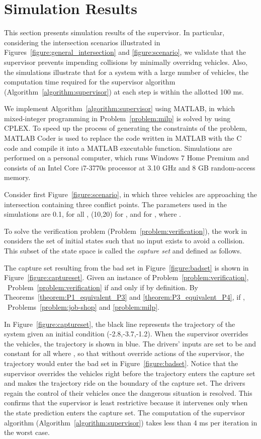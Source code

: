 \documentclass{sig-alternate}
\begin{document}
\section{Simulation Results}\label{section:simulation_results}
This section presents simulation results of the supervisor. In particular, considering the intersection scenarios illustrated in Figures~\ref{figure:general_intersection} and \ref{figure:scenario}, we validate that the supervisor prevents impending collisions by minimally overridng vehicles. Also, the simulations illustrate that for a system with a large number of vehicles, the computation time required for the supervisor algorithm (Algorithm~\ref{algorithm:supervisor}) at each step is within the allotted 100 ms.

 We implement Algorithm~\ref{algorithm:supervisor} using MATLAB, in which mixed-integer programming in Problem~\ref{problem:milp} is solved by using CPLEX. To speed up the process of generating the constraints of the problem, MATLAB Coder\texttrademark \cite{Matlab_coder_2015} is used to replace the code written in MATLAB with the C code and compile it into a MATLAB executable function. Simulations are performed on a personal computer, which runs Windows 7 Home Premium and consists of an Intel Core i7-3770s processor at 3.10 GHz and 8 GB random-access memory.

Consider first Figure~\ref{figure:scenario}, in which three vehicles are approaching the intersection containing three conflict points. The parameters used in the simulations are 0.1,  for all , (10,20) for , and  for , where . 

To solve the verification problem (Problem~\ref{problem:verification}), the work in \cite{hafner_cooperative_2013} considers the set of initial states such that no input exists to avoid a collision. This subset of the state space is called the \textit{capture set} and defined as follows.
	
	The capture set resulting from the bad set in Figure~\ref{figure:badset} is shown in Figure~\ref{figure:captureset}.
Given an instance  of Problem~\ref{problem:verification}, ~Problem~\ref{problem:verification} if and only if  by definition. By Theorems~\ref{theorem:P1_equivalent_P3} and \ref{theorem:P3_equivalent_P4}, if , ~Problems~\ref{problem:job-shop} and \ref{problem:milp}.

In Figure~\ref{figure:captureset}, the black line represents the trajectory of the system given an initial condition (-2.8,-3.7,-1.2). When the supervisor overrides the vehicles, the trajectory is shown in blue. The drivers' inputs are set to be  and constant for all  where , so that without override actions of the supervisor, the trajectory would enter the bad set in Figure~\ref{figure:badset}. Notice that the supervisor overrides the vehicles right before the trajectory enters the capture set and makes the trajectory ride on the boundary of the capture set. The drivers regain the control of their vehicles once the dangerous situation is resolved. This confirms that the supervisor is least restrictive because it intervenes only when the state prediction  enters the capture set. The computation of the supervisor algorithm (Algorithm~\ref{algorithm:supervisor}) takes less than 4 ms per iteration in the worst case.
\end{document}
